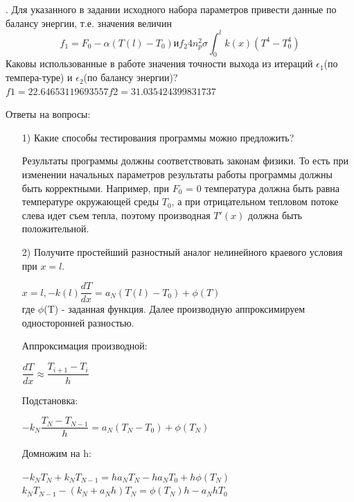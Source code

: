 \documentclass[14pt, a4paper]{extarticle}
\begin{document}
. Для указанного в задании исходного набора параметров привести данные по балансу энергии, т.е. значения величин
\begin{equation*}
	f_1 = F_0 - \alpha(T(l) - T_0) \text{и} f_2 4n_p^2\sigma\int_{0}^{l}k(x)(T^4 - T_0^4)
\end{equation*}
Каковы использованные в работе значения точности выхода из итераций $\epsilon_1$(по темпера-туре) и $\epsilon_2$(по балансу энергии)?\\
$f1 = 22.64653119693557 f2 = 31.035424399831737$

\newpage

Ответы на вопросы: \par
\begin{itemize}
	\item[1)] Какие способы тестирования программы можно предложить?\par
	Результаты программы должны соответствовать законам физики. То есть при изменении начальных параметров результаты работы программы должны быть корректными. Например, при $F_0$ = 0 температура должна быть равна температуре окружающей среды $T_0$, а при отрицательном тепловом потоке слева идет съем тепла, поэтому производная $T' (x)$ должна быть положительной.
	
	\item[2)] Получите простейший разностный аналог нелинейного краевого условия при $x = l$.\par
	
		$x = l, -k(l) \dfrac{dT}{dx} = a_N(T(l) - T_0) + \phi(T)$ \\
		где $\phi$(T) - заданная функция. Далее производную аппроксимируем односторонней разностью.\par
		
		Аппроксимация производной:\par
		$\dfrac{dT}{dx} \approx \dfrac{T_{i+1} - T_i} {h}$
		
		Подстановка:\par
		$-k_N \dfrac{T_N - T_{N-1}}{h} = a_N(T_N - T_0) + \phi(T_N)$
		
		 Домножим на h:\par
		 $-k_NT_N + k_NT_{N-1} = ha_NT_N - ha_NT_0 + h\phi(T_N)$\\
		 $k_NT_{N-1} - (k_N + a_Nh)T_N = \phi(T_N)h - a_NhT_0$

\end{itemize}
\end{document}
